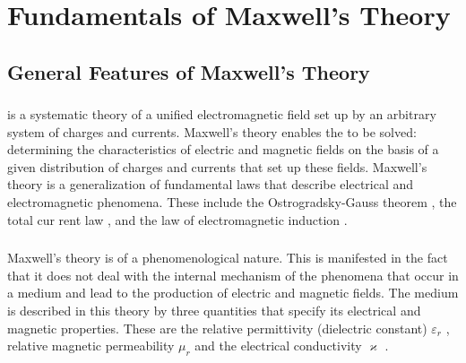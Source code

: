





\chapter{Fundamentals of Maxwell's Theory}
\label{ch-27}

\section{General Features of Maxwell's Theory}
\label{sec-27.1}


\subsection{}\label{27.1.1}  is a systematic theory of a unified electromagnetic field  set up by an arbitrary system of charges and currents. Maxwell's theory enables the  to be solved: determining the characteristics of electric and magnetic fields on the basis of a given distribution of charges and currents that set up these fields. Maxwell's theory is a generalization of fundamental laws that describe electrical and electromagnetic phenomena. These include the Ostrogradsky-Gauss theorem , the total cur­ rent law , and the law of electromagnetic induction .

\subsection{}\label{27.1.2} Maxwell's theory is of a phenomenological nature. This is manifested in the fact that it does not deal with the internal mechanism of the phenomena that occur in a medium and lead to the production of electric and magnetic fields. The medium is described in this theory by three quantities that specify its electrical and magnetic properties. These are the relative permittivity (dielectric constant) $\varepsilon_{r}$ , relative magnetic permeability $\mu_{r}$  and the electrical conductivity $\varkappa$ .

